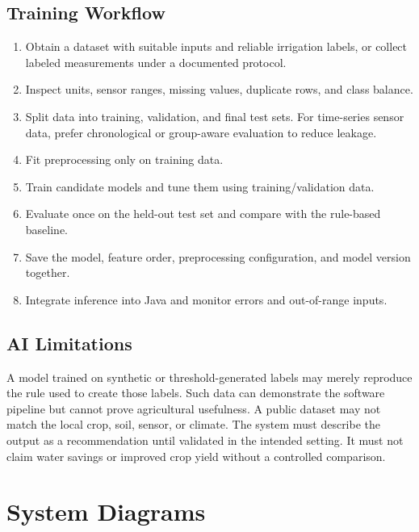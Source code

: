 \documentclass[12pt,a4paper]{report}
\begin{document}
\section{Training Workflow}
\begin{enumerate}[leftmargin=*]
\item Obtain a dataset with suitable inputs and reliable irrigation labels, or collect labeled measurements under a documented protocol.
\item Inspect units, sensor ranges, missing values, duplicate rows, and class balance.
\item Split data into training, validation, and final test sets. For time-series sensor data, prefer chronological or group-aware evaluation to reduce leakage.
\item Fit preprocessing only on training data.
\item Train candidate models and tune them using training/validation data.
\item Evaluate once on the held-out test set and compare with the rule-based baseline.
\item Save the model, feature order, preprocessing configuration, and model version together.
\item Integrate inference into Java and monitor errors and out-of-range inputs.
\end{enumerate}

\section{AI Limitations}
A model trained on synthetic or threshold-generated labels may merely reproduce the rule used to create those labels. Such data can demonstrate the software pipeline but cannot prove agricultural usefulness. A public dataset may not match the local crop, soil, sensor, or climate. The system must describe the output as a recommendation until validated in the intended setting. It must not claim water savings or improved crop yield without a controlled comparison.

\chapter{System Diagrams}
\end{document}

